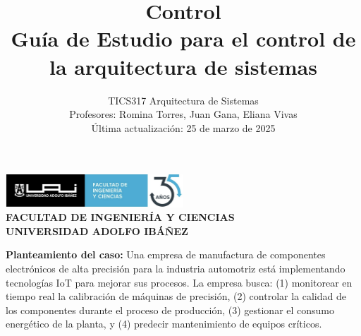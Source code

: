 \documentclass{article}
\begin{document}
\begin{center}
    \includegraphics[width=0.5\textwidth]{Pictures/logo.png} \\ %
    \textbf{FACULTAD DE INGENIERÍA Y CIENCIAS} \\ 
    \textbf{UNIVERSIDAD ADOLFO IBÁÑEZ} \\ 

\end{center}
\title{Control \\ Guía de Estudio para el control de la arquitectura de sistemas}
\author{TICS317 Arquitectura de Sistemas \\ Profesores: Romina Torres, Juan Gana, Eliana Vivas \\ Última actualización: 25 de marzo de 2025}
\date{}
\maketitle



\begin{flushleft}
\textbf{Planteamiento del caso:} 
Una empresa de manufactura de componentes electrónicos de alta precisión para la industria automotriz está implementando tecnologías IoT para mejorar sus procesos. La empresa busca: (1) monitorear en tiempo real la calibración de máquinas de precisión, (2) controlar la calidad de los componentes durante el proceso de producción, (3) gestionar el consumo energético de la planta, y (4) predecir mantenimiento de equipos críticos.
\end{flushleft}
\end{document}
